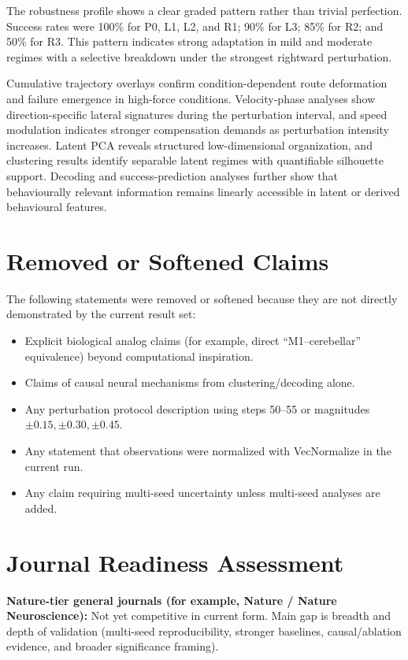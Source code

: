 The robustness profile shows a clear graded pattern rather than trivial perfection. Success rates were 100\% for P0, L1, L2, and R1; 90\% for L3; 85\% for R2; and 50\% for R3. This pattern indicates strong adaptation in mild and moderate regimes with a selective breakdown under the strongest rightward perturbation.

Cumulative trajectory overlays confirm condition-dependent route deformation and failure emergence in high-force conditions. Velocity-phase analyses show direction-specific lateral signatures during the perturbation interval, and speed modulation indicates stronger compensation demands as perturbation intensity increases. Latent PCA reveals structured low-dimensional organization, and clustering results identify separable latent regimes with quantifiable silhouette support. Decoding and success-prediction analyses further show that behaviourally relevant information remains linearly accessible in latent or derived behavioural features.

\section{Removed or Softened Claims}
\label{sec:removed_claims}

The following statements were removed or softened because they are not directly demonstrated by the current result set:
\begin{itemize}
\item Explicit biological analog claims (for example, direct ``M1--cerebellar'' equivalence) beyond computational inspiration.
\item Claims of causal neural mechanisms from clustering/decoding alone.
\item Any perturbation protocol description using steps 50--55 or magnitudes $\pm0.15, \pm0.30, \pm0.45$.
\item Any statement that observations were normalized with VecNormalize in the current run.
\item Any claim requiring multi-seed uncertainty unless multi-seed analyses are added.
\end{itemize}

\section{Journal Readiness Assessment}
\label{sec:journal_readiness}

\textbf{Nature-tier general journals (for example, Nature / Nature Neuroscience):} Not yet competitive in current form. Main gap is breadth and depth of validation (multi-seed reproducibility, stronger baselines, causal/ablation evidence, and broader significance framing).

